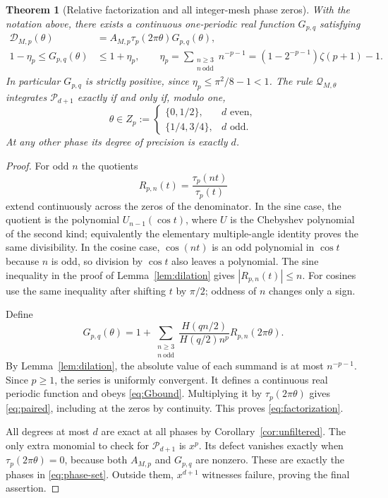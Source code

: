 \documentclass[11pt,a4paper]{article}
\numberwithin{equation}{section}
\newtheorem{theorem}{Theorem}[section]
\theoremstyle{definition}
\theoremstyle{remark}
\newcommand{\Pol}{\mathcal P}\newcommand{\norm}[1]{\left\lVert#1\right\rVert}
\newcommand{\Q}{\mathcal Q}\newcommand{\Def}{\mathcal D}
\begin{document}
\begin{theorem}[Relative factorization and all integer-mesh phase zeros]
\label{thm:factorization}
With the notation above, there exists a continuous one-periodic real
function $G_{p,q}$ satisfying
\begin{align}
 \Def_{M,p}(\theta)
 &=A_{M,p}\tau_p(2\pi\theta)G_{p,q}(\theta),
 \label{eq:factorization}\\
 1-\eta_p\le G_{p,q}(\theta)&\le1+\eta_p,
 \qquad
 \eta_p=\sum_{\substack{n\ge3\\n\ \mathrm{odd}}}n^{-p-1}
 =(1-2^{-p-1})\zeta(p+1)-1.
 \label{eq:Gbound}
\end{align}
In particular $G_{p,q}$ is strictly positive, since
$\eta_p\le\pi^2/8-1<1$. The rule $\Q_{M,\theta}$ integrates
$\Pol_{d+1}$ exactly if and only if, modulo one,
\begin{equation}
 \theta\in Z_p:=
 \begin{cases}
 \{0,1/2\},&d\text{ even},\\
 \{1/4,3/4\},&d\text{ odd}.
 \end{cases}
 \label{eq:phase-set}
\end{equation}
At any other phase its degree of precision is exactly $d$.
\end{theorem}

\begin{proof}
For odd $n$ the quotients
\[
 R_{p,n}(t)=\frac{\tau_p(nt)}{\tau_p(t)}
\]
extend continuously across the zeros of the denominator. In the sine
case, the quotient is the polynomial $U_{n-1}(\cos t)$, where $U$ is
the Chebyshev polynomial of the second kind; equivalently the elementary
multiple-angle identity proves the same divisibility. In the cosine case,
$\cos(nt)$ is an odd polynomial in $\cos t$ because $n$ is odd,
so division by $\cos t$ also leaves a polynomial. The sine inequality
in the proof of Lemma~\ref{lem:dilation} gives $|R_{p,n}(t)|\le n$.
For cosines use the same inequality after shifting $t$ by $\pi/2$;
oddness of $n$ changes only a sign.

Define
\begin{equation}
 G_{p,q}(\theta)=1+
 \sum_{\substack{n\ge3\\n\ \mathrm{odd}}}
 \frac{H(qn/2)}{H(q/2)n^p}R_{p,n}(2\pi\theta).
 \label{eq:Gseries}
\end{equation}
By Lemma~\ref{lem:dilation}, the absolute value of each summand is at
most $n^{-p-1}$. Since $p\ge1$, the series is uniformly convergent.
It defines a continuous real periodic function and obeys
\eqref{eq:Gbound}. Multiplying it by $\tau_p(2\pi\theta)$ gives
\eqref{eq:paired}, including at the zeros by continuity. This proves
\eqref{eq:factorization}.

All degrees at most $d$ are exact at all phases by
Corollary~\ref{cor:unfiltered}. The only extra monomial to check for
$\Pol_{d+1}$ is $x^p$. Its defect vanishes exactly when
$\tau_p(2\pi\theta)=0$, because both $A_{M,p}$ and $G_{p,q}$ are
nonzero. These are exactly the phases in \eqref{eq:phase-set}.
Outside them, $x^{d+1}$ witnesses failure, proving the final assertion.
\end{proof}
\end{document}
